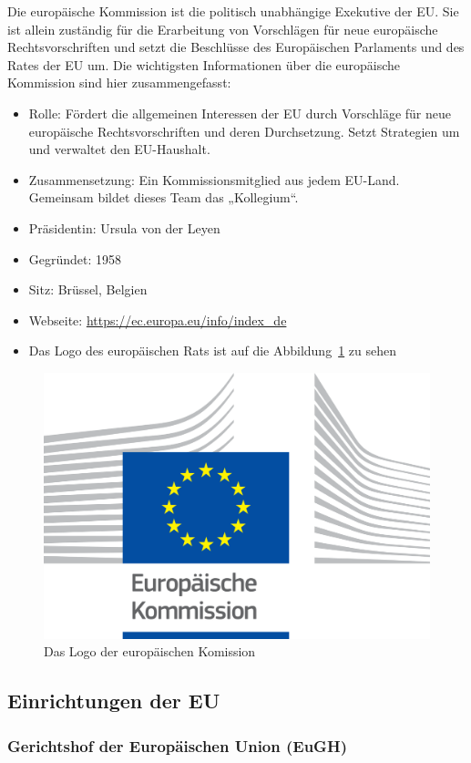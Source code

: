 Die europäische Kommission ist die politisch unabhängige Exekutive der EU. Sie ist allein zuständig für die Erarbeitung von Vorschlägen für neue europäische Rechtsvorschriften und setzt die Beschlüsse des Europäischen Parlaments und des Rates der EU um.\newline
Die wichtigsten Informationen über die europäische Kommission sind hier zusammengefasst:
\begin{itemize}
  \item Rolle: Fördert die allgemeinen Interessen der EU durch Vorschläge für neue europäische Rechtsvorschriften und deren Durchsetzung. Setzt Strategien um und verwaltet den EU-Haushalt.
  \item Zusammensetzung: Ein Kommissionsmitglied aus jedem EU-Land. Gemeinsam bildet dieses Team das „Kollegium“.
  \item Präsidentin: Ursula von der Leyen
  \item Gegründet: 1958
    \item Sitz: Brüssel, Belgien
    \item Webseite: \url{https://ec.europa.eu/info/index_de}
    \item Das Logo des europäischen Rats ist auf die Abbildung~\ref{fig:logoEuroKomission} zu sehen
\end{itemize}

\begin{figure}[H]
\centering
    \includegraphics[width=.5\textwidth]{images/Euro_Komission.png}
    \caption{Das Logo der europäischen Komission}
    \label{fig:logoEuroKomission}
\end{figure}

\subsection{Einrichtungen der EU}

\subsubsection{Gerichtshof der Europäischen Union (EuGH)}\label{subsubsec:EuroGerichtshof}

